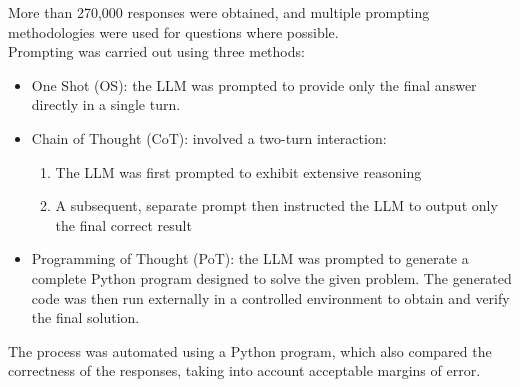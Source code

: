 \documentclass[12pt]{article}
\begin{document}
More than 270,000 responses were obtained, and multiple prompting methodologies were used for questions where possible.\\
Prompting was carried out using three methods:
\begin{itemize}
	\item One Shot (OS): the LLM was prompted to provide only the final answer directly in a single turn.\\
	\item Chain of Thought (CoT): involved a two-turn interaction:
	\begin{enumerate}
		\item The LLM was first prompted to exhibit extensive reasoning
		\item A subsequent, separate prompt then instructed the LLM to output only the final correct result
	\end{enumerate}
	\item Programming of Thought (PoT): the LLM was prompted to generate a complete Python program designed to solve the given problem. The generated code was then run externally in a controlled environment to obtain and verify the final solution.\\
\end{itemize}

The process was automated using a Python program, which also compared the correctness of the responses, taking into account acceptable margins of error.\\
        
\end{document}
